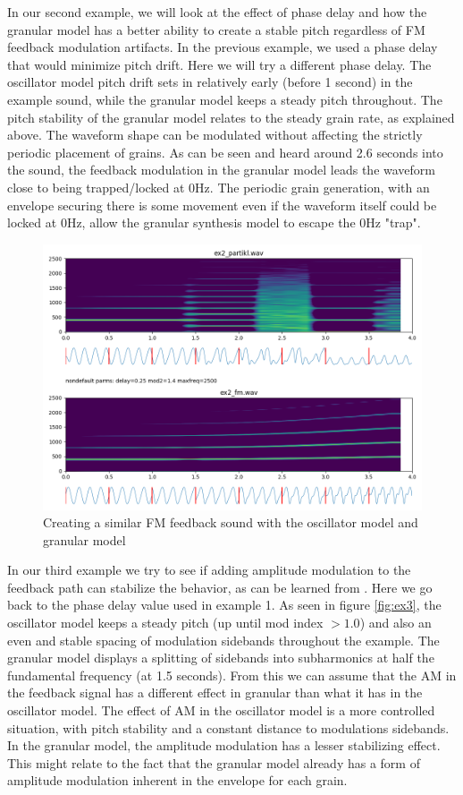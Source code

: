 \documentclass[runningheads,a4paper]{llncs}
\begin{document}
In our second example, we will look at the effect of phase delay and how the granular model has a better ability to create a stable pitch regardless of FM feedback modulation artifacts. In the previous example, we used a phase delay that would minimize pitch drift. Here we will try a different phase delay. The oscillator model pitch drift sets in relatively early (before 1 second) in the example sound, while the granular model keeps a steady pitch throughout. The pitch stability of the granular model relates to the steady grain rate, as explained above. The waveform shape can be modulated without affecting the strictly periodic placement of grains. As can be seen and heard around 2.6 seconds into the sound, the feedback modulation in the granular model leads the waveform close to being trapped/locked at 0Hz. The periodic grain generation, with an envelope securing there is some movement even if the waveform itself could be locked at 0Hz, allow the granular synthesis model to escape the 0Hz "trap".

\begin{figure}
	\centering
	\includegraphics[width=.95\textwidth]{ex2_compare.png}
	\caption{Creating a similar FM feedback sound with the oscillator model and granular model}
	\label{fig:ex2}
\end{figure}

In our third example we  try to see if adding amplitude modulation to the feedback path can stabilize the behavior, as can be learned from \cite{Lazzarini-2024}. Here we go back to the phase delay value used in example 1. As seen in figure \ref{fig:ex3}, the oscillator model keeps a steady pitch (up until mod index $> 1.0$) and also an even and stable spacing of modulation sidebands throughout the example. The granular model displays a splitting of sidebands into subharmonics at half the fundamental frequency (at 1.5 seconds). From this we can assume that the AM in the feedback signal has a different effect in granular than what it has in the oscillator model. The effect of AM in the oscillator model is a more controlled situation, with pitch stability and a constant distance to modulations sidebands. In the granular model, the amplitude modulation has a lesser stabilizing effect. This might relate to the fact that the granular model already has a form of amplitude modulation inherent in the envelope for each grain.
\end{document}
